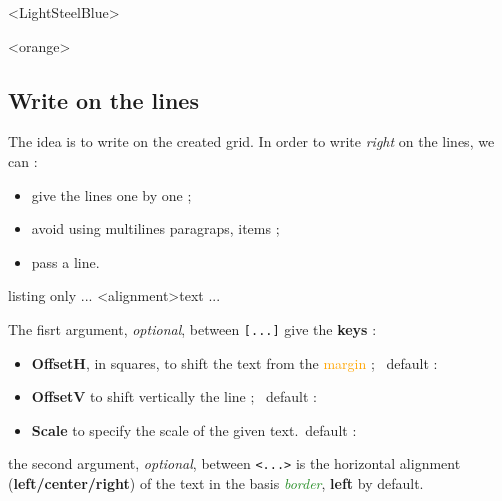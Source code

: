 \documentclass[a4paper]{article}
\newcommand\Cle[1]{{\bfseries\sffamily\textlangle #1\textrangle}}
\begin{document}
\smallskip

\begin{EnvGrid}[NumSquares=36x8,Enlarge=3/3,Border]<LightSteelBlue>
\end{EnvGrid}

\begin{center}
	\begin{EnvGrid}[NumSquares=15x5,Enlarge=1/2,Seyes,Border]<orange>
	\end{EnvGrid}
\end{center}

\pagebreak

\subsection{Write on the lines}

The idea is to write on the created grid. In order to write \textit{right} on the lines, we can :

\begin{itemize}
	\item give the lines one by one ;
	\item avoid using multilines paragraps, items ;
	\item pass a line.
\end{itemize}

\begin{PresentationCode}{listing only}
...
	\WriteLine[keys]<alignment>{text}
	\PassLine
...
\end{PresentationCode}

The fisrt argument, \textit{optional}, between \texttt{[...]} give the \Cle{keys} :

\begin{itemize}
	\item \Cle{OffsetH}, in squares, to shift the text from the \textcolor{orange}{margin} ; \hfill~default : \Cle{0}
	\item \Cle{OffsetV} to shift vertically the line ; \hfill~default : \Cle{0pt}
	\item \Cle{Scale} to specify the scale of the given text.\hfill~default : \Cle{1}
\end{itemize}

the second argument, \textit{optional}, between \texttt{<...>} is the horizontal alignment (\Cle{left/center/right}) of the text in the basis \textcolor{ForestGreen}{\textit{border}}, \Cle{left} by default.

\medskip
\end{document}
